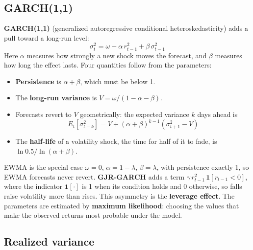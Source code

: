 \subsection{GARCH(1,1)}
\label{sec:11-garch}

\textbf{GARCH(1,1)} (generalized autoregressive conditional heteroskedasticity) adds a pull toward a long-run level:
\begin{equation}
  \sigma^2_t = \omega + \alpha\,r^2_{t-1} + \beta\,\sigma^2_{t-1}
  \label{eq:11-garch}
\end{equation}
Here $\alpha$ measures how strongly a new shock moves the forecast, and $\beta$ measures how long the effect lasts. Four quantities follow from the parameters:

\begin{itemize}
  \item \textbf{Persistence} is $\alpha + \beta$, which must be below 1.
  \item The \textbf{long-run variance} is $V = \omega / (1 - \alpha - \beta)$.
  \item Forecasts revert to $V$ geometrically: the expected variance $k$ days ahead is
  \begin{equation}
    E_t[\sigma^2_{t+k}] = V + (\alpha + \beta)^{k-1}\left(\sigma^2_{t+1} - V\right)
    \label{eq:11-forecast}
  \end{equation}
  \item The \textbf{half-life} of a volatility shock, the time for half of it to fade, is $\ln 0.5 / \ln(\alpha + \beta)$.
\end{itemize}

EWMA is the special case $\omega = 0$, $\alpha = 1 - \lambda$, $\beta = \lambda$, with persistence exactly 1, so EWMA forecasts never revert. \textbf{GJR-GARCH} adds a term $\gamma\,r^2_{t-1}\,\mathbf{1}[r_{t-1} < 0]$, where the indicator $\mathbf{1}[\cdot]$ is 1 when its condition holds and 0 otherwise, so falls raise volatility more than rises. This asymmetry is the \textbf{leverage effect}. The parameters are estimated by \textbf{maximum likelihood}: choosing the values that make the observed returns most probable under the model.

\subsection{Realized variance}
\label{sec:11-rv}

